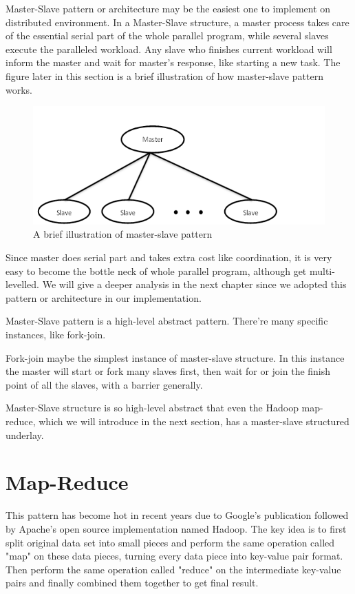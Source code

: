 Master-Slave pattern or architecture may be the easiest one to implement on distributed environment. In a Master-Slave structure, a master process takes care of the essential serial part of the whole parallel program, while several slaves execute the paralleled workload. Any slave who finishes current workload will inform the master and wait for master's response, like starting a new task. The figure later in this section is a brief illustration of how master-slave pattern works.

\begin{figure}[ht]
\centering
\includegraphics[width=120mm]{master-slave-brief.png}
\caption{A brief illustration of master-slave pattern}
\end{figure}

Since master does serial part and takes extra cost like coordination, it is very easy to become the bottle neck of whole parallel program, although get multi-levelled. We will give a deeper analysis in the next chapter since we adopted this pattern or architecture in our implementation.

Master-Slave pattern is a high-level abstract pattern. There're many specific instances, like fork-join. 

Fork-join maybe the simplest instance of master-slave structure. In this instance the master will start or fork many slaves first, then wait for or join the finish point of all the slaves, with a barrier generally.

Master-Slave structure is so high-level abstract that even the Hadoop map-reduce, which we will introduce in the next section, has a master-slave structured underlay.

\section{Map-Reduce}

This pattern has become hot in recent years due to Google's publication \cite{google-map-reduce} followed by Apache's open source implementation named Hadoop. The key idea is to first split original data set into small pieces and perform the same operation called "map" on these data pieces, turning every data piece into key-value pair format. Then perform the same operation called "reduce" on the intermediate key-value pairs and finally combined them together to get final result.

